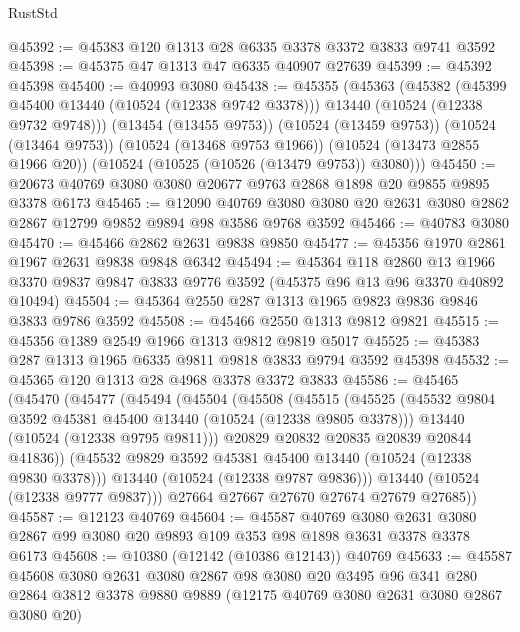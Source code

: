 \begin{lexlean}{RustStd}
\begin{coremodule}
@45392 := @45383 @120 @1313 @28 @6335 @3378 @3372 @3833 @9741 @3592
@45398 := @45375 @47 @1313 @47 @6335 @40907 @27639
@45399 := @45392 @45398
@45400 := @40993 @3080
@45438 := @45355
    (@45363
      (@45382
        (@45399 @45400 @13440 (@10524 (@12338 @9742 @3378)))
        @13440
        (@10524 (@12338 @9732 @9748)))
      (@13454 (@13455 @9753))
      (@10524 (@13459 @9753))
      (@10524 (@13464 @9753))
      (@10524 (@13468 @9753 @1966))
      (@10524 (@13473 @2855 @1966 @20))
      (@10524 (@10525 (@10526 (@13479 @9753)) @3080)))
@45450 := @20673 @40769 @3080 @3080 @20677 @9763 @2868 @1898 @20 @9855 @9895 @3378 @6173
@45465 := @12090
    @40769
    @3080
    @3080
    @20
    @2631
    @3080
    @2862
    @2867
    @12799
    @9852
    @9894
    @98
    @3586
    @9768
    @3592
@45466 := @40783 @3080
@45470 := @45466 @2862 @2631 @9838 @9850
@45477 := @45356 @1970 @2861 @1967 @2631 @9838 @9848 @6342
@45494 := @45364
    @118
    @2860
    @13
    @1966
    @3370
    @9837
    @9847
    @3833
    @9776
    @3592
    (@45375 @96 @13 @96 @3370 @40892 @10494)
@45504 := @45364 @2550 @287 @1313 @1965 @9823 @9836 @9846 @3833 @9786 @3592
@45508 := @45466 @2550 @1313 @9812 @9821
@45515 := @45356 @1389 @2549 @1966 @1313 @9812 @9819 @5017
@45525 := @45383 @287 @1313 @1965 @6335 @9811 @9818 @3833 @9794 @3592 @45398
@45532 := @45365 @120 @1313 @28 @4968 @3378 @3372 @3833
@45586 := @45465
    (@45470
      (@45477
        (@45494
          (@45504
            (@45508
              (@45515
                (@45525
                  (@45532 @9804 @3592 @45381 @45400 @13440 (@10524 (@12338 @9805 @3378)))
                  @13440
                  (@10524 (@12338 @9795 @9811)))
                @20829
                @20832
                @20835
                @20839
                @20844
                @41836))
            (@45532 @9829 @3592 @45381 @45400 @13440 (@10524 (@12338 @9830 @3378)))
            @13440
            (@10524 (@12338 @9787 @9836)))
          @13440
          (@10524 (@12338 @9777 @9837)))
        @27664
        @27667
        @27670
        @27674
        @27679
        @27685))
@45587 := @12123 @40769
@45604 := @45587
    @40769
    @3080
    @2631
    @3080
    @2867
    @99
    @3080
    @20
    @9893
    @109
    @353
    @98
    @1898
    @3631
    @3378
    @3378
    @6173
@45608 := @10380 (@12142 (@10386 @12143)) @40769
@45633 := @45587
    @45608
    @3080
    @2631
    @3080
    @2867
    @98
    @3080
    @20
    @3495
    @96
    @341
    @280
    @2864
    @3812
    @3378
    @9880
    @9889
    (@12175 @40769 @3080 @2631 @3080 @2867 @3080 @20)

\end{coremodule}
\end{lexlean}
